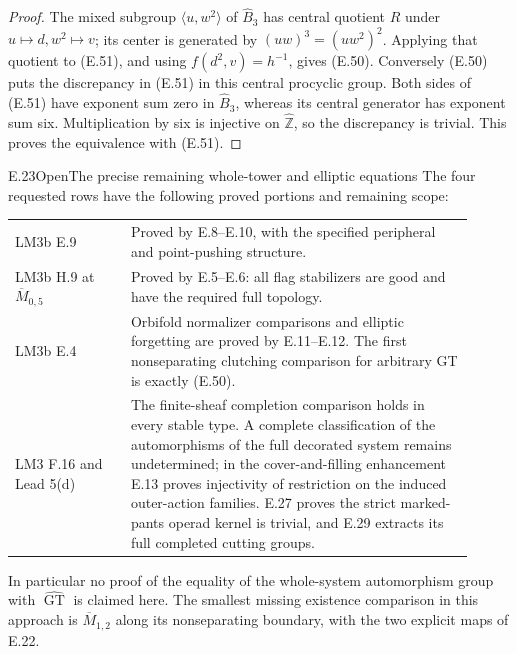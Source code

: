\begin{proof}
The mixed subgroup $\langle u,w^2\rangle$ of
$\widehat B_3$ has central quotient $R$ under
$u\mapsto d,w^2\mapsto v$; its center is generated
by $(uw)^3=(uw^2)^2$.  Applying that quotient to
(E.51), and using $f(d^2,v)=h^{-1}$, gives (E.50).
Conversely (E.50) puts the discrepancy in (E.51)
in this central procyclic group.  Both sides of
(E.51) have exponent sum zero in $\widehat B_3$,
whereas its central generator has exponent sum six.
Multiplication by six is injective on
$\widehat{\mathbb Z}$, so the discrepancy is trivial.
This proves the equivalence with (E.51).
\end{proof}

\begin{result}{E.23}{Open}{The precise remaining whole-tower and elliptic equations}
The four requested rows have the following proved portions
and remaining scope:
\begin{center}
\begin{tabular}{p{0.23\linewidth}|p{0.68\linewidth}}
LM3b E.9 & Proved by E.8--E.10, with the specified
peripheral and point-pushing structure.\\
LM3b H.9 at $\overline M_{0,5}$ & Proved by E.5--E.6:
all flag stabilizers are good and have the required full topology.\\
LM3b E.4 & Orbifold normalizer comparisons and elliptic
forgetting are proved by E.11--E.12. The first nonseparating
clutching comparison for arbitrary GT is exactly (E.50).\\
LM3 F.16 and Lead 5(d) & The finite-sheaf completion
comparison holds in every stable type. A complete classification
of the automorphisms of the full decorated system remains
undetermined; in the cover-and-filling enhancement E.13 proves
injectivity of restriction on the induced outer-action families.
E.27 proves the strict marked-pants operad kernel is trivial,
and E.29 extracts its full completed cutting groups.
\end{tabular}
\end{center}
In particular no proof of the equality of the whole-system
automorphism group with $\widehat{\operatorname{GT}}$ is
claimed here.  The smallest missing existence comparison
in this approach is $\overline M_{1,2}$ along its
nonseparating boundary, with the two explicit maps of E.22.
\end{result}

